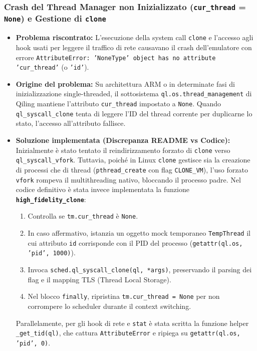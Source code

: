\documentclass[11pt,a4paper]{article}
\begin{document}
\subsubsection{Crash del Thread Manager non Inizializzato (\texttt{cur\_thread} = \texttt{None}) e Gestione di \texttt{clone}}
\begin{itemize}
    \item \textbf{Problema riscontrato:} L'esecuzione della system call \texttt{clone} e l'accesso agli hook usati per leggere il traffico di rete causavano il crash dell'emulatore con errore \texttt{AttributeError: 'NoneType' object has no attribute 'cur\_thread'} (o \texttt{'id'}).
    \item \textbf{Origine del problema:} Su architettura ARM o in determinate fasi di inizializzazione single-threaded, il sottosistema \texttt{ql.os.thread\_management} di Qiling mantiene l'attributo \texttt{cur\_thread} impostato a \texttt{None}. Quando \texttt{ql\_syscall\_clone} tenta di leggere l'ID del thread corrente per duplicarne lo stato, l'accesso all'attributo fallisce.
    \item \textbf{Soluzione implementata (Discrepanza README vs Codice):} Inizialmente è stato tentato il reindirizzamento forzato di \texttt{clone} verso \texttt{ql\_syscall\_vfork}. Tuttavia, poiché in Linux \texttt{clone} gestisce sia la creazione di processi che di thread (\texttt{pthread\_create} con flag \texttt{CLONE\_VM}), l'uso forzato \texttt{vfork} rompeva il multithreading nativo, bloccando il processo padre. Nel codice definitivo è stata invece implementata la funzione \textbf{\texttt{high\_fidelity\_clone}}:
    \begin{enumerate}
        \item Controlla se \texttt{tm.cur\_thread} è \texttt{None}.
        \item In caso affermativo, istanzia un oggetto mock temporaneo \texttt{TempThread} il cui attributo \texttt{id} corrisponde con il PID del processo (\texttt{getattr(ql.os, 'pid', 1000)}).
        \item Invoca \texttt{sched.ql\_syscall\_clone(ql, *args)}, preservando il parsing dei flag e il mapping TLS (Thread Local Storage).
        \item Nel blocco \texttt{finally}, ripristina \texttt{tm.cur\_thread = None} per non corrompere lo scheduler durante il context switching.
    \end{enumerate}
    Parallelamente, per gli hook di rete e \texttt{stat} è stata scritta la funzione helper \texttt{\_get\_tid(ql)}, che cattura \texttt{AttributeError} e ripiega su \texttt{getattr(ql.os, 'pid', 0)}.
\end{itemize}
\end{document}
